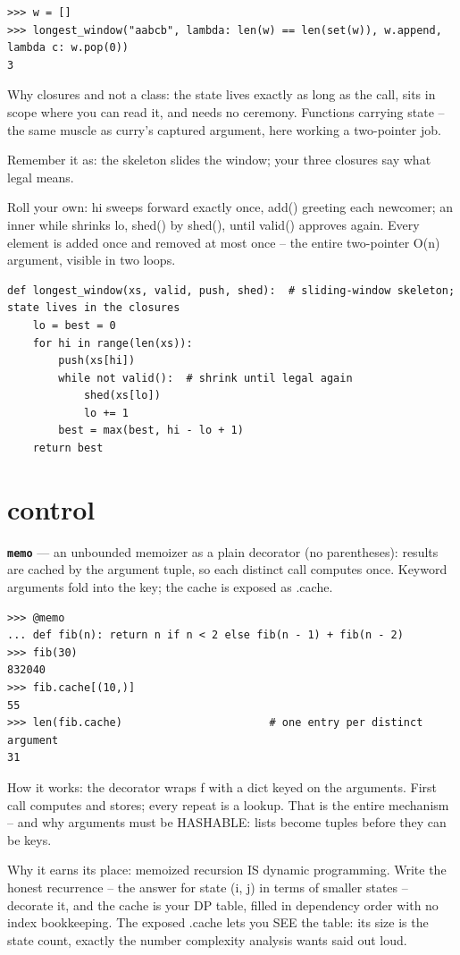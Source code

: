 \documentclass[10pt,letterpaper]{article}
\begin{document}
\begin{lstlisting}[style=ex]
>>> w = []
>>> longest_window("aabcb", lambda: len(w) == len(set(w)), w.append, lambda c: w.pop(0))
3
\end{lstlisting}

Why closures and not a class: the state lives exactly as long as the call, sits in scope where you can read it, and needs no ceremony. Functions carrying state -- the same muscle as curry's captured argument, here working a two-pointer job.


Remember it as: the skeleton slides the window; your three closures say what legal means.


Roll your own: hi sweeps forward exactly once, add() greeting each newcomer; an inner while shrinks lo, shed() by shed(), until valid() approves again. Every element is added once and removed at most once -- the entire two-pointer O(n) argument, visible in two loops.

\begin{lstlisting}[style=ex]
def longest_window(xs, valid, push, shed):  # sliding-window skeleton; state lives in the closures
    lo = best = 0
    for hi in range(len(xs)):
        push(xs[hi])
        while not valid():  # shrink until legal again
            shed(xs[lo])
            lo += 1
        best = max(best, hi - lo + 1)
    return best
\end{lstlisting}

\section{control}
\textbf{\texttt{memo}} --- an unbounded memoizer as a plain decorator (no parentheses): results are cached by the argument tuple, so each distinct call computes once. Keyword arguments fold into the key; the cache is exposed as .cache.
\begin{lstlisting}[style=ex]
>>> @memo
... def fib(n): return n if n < 2 else fib(n - 1) + fib(n - 2)
>>> fib(30)
832040
>>> fib.cache[(10,)]
55
>>> len(fib.cache)                       # one entry per distinct argument
31
\end{lstlisting}

How it works: the decorator wraps f with a dict keyed on the arguments. First call computes and stores; every repeat is a lookup. That is the entire mechanism -- and why arguments must be HASHABLE: lists become tuples before they can be keys.


Why it earns its place: memoized recursion IS dynamic programming. Write the honest recurrence -- the answer for state (i, j) in terms of smaller states -- decorate it, and the cache is your DP table, filled in dependency order with no index bookkeeping. The exposed .cache lets you SEE the table: its size is the state count, exactly the number complexity analysis wants said out loud.
\end{document}
